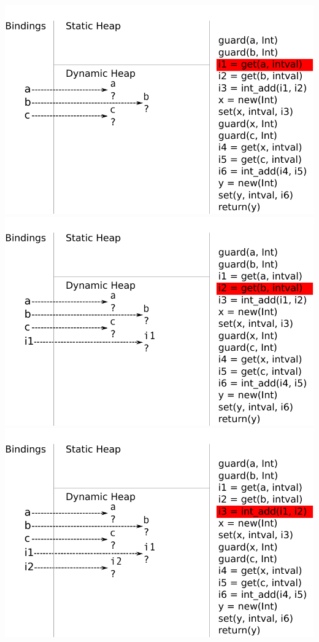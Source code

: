 \documentclass[utf8x]{beamer}
\begin{document}
\begin{frame}[plain]
{\includegraphics[scale=0.8]{figures/ex03}}
{\includegraphics[scale=0.8]{figures/ex04}}
{\includegraphics[scale=0.8]{figures/ex05}}

\end{frame}
\end{document}
